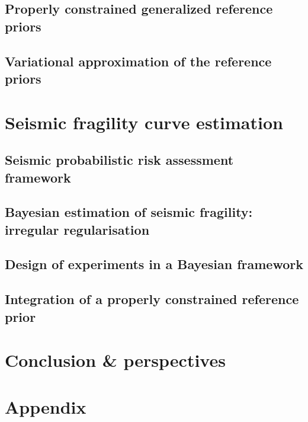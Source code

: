 \documentclass[a4paper]{book}
\renewcommand{\familydefault}{\sfdefault}
\begin{document}
\chapter{Properly constrained generalized reference priors}

\chapter{Variational approximation of the reference priors}




\part{Seismic fragility curve estimation}


\chapter{Seismic probabilistic risk assessment framework}


\chapter{Bayesian estimation of seismic fragility: irregular regularisation}


\chapter{Design of experiments in a Bayesian framework}


\chapter{Integration of a properly constrained reference prior}




\part{Conclusion \& perspectives}



\part*{Appendix}






\renewcommand{\familydefault}{\sfdefault}

\end{document}
